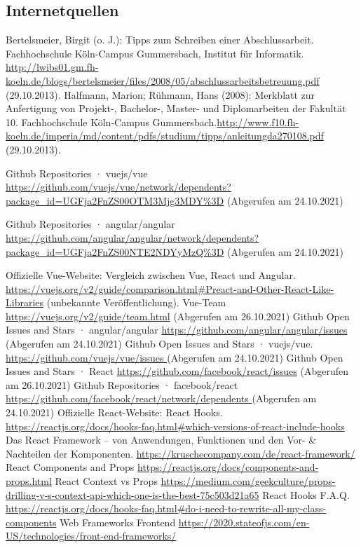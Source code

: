      \subsection{Internetquellen}
     \begin{thebibliography}{HR08} %
         Bertelsmeier, Birgit (o. J.): Tipps zum Schrei\-b\-en ei\-n\-er Ab\-sch\-luss\-ar\-beit. Fach\-hoch\-schu\-le Köln-Campus Gummersbach, Institut für Informatik. \url{http://lwibs01.gm.fh-koeln.de/blogs/bertelsmeier/files/2008/05/abschlussarbeitsbetreuung.pdf} (29.10.2013).
          Halfmann, Marion; Rühmann, Hans (2008): Merkblatt zur Anfertigung von Projekt-, Bachelor-, Master- und Diplomarbeiten der Fakultät 10. Fachhochschule Köln-Campus Gummersbach.\url{http://www.f10.fh-koeln.de/imperia/md/content/pdfs/studium/tipps/anleitungda270108.pdf} (29.10.2013).

          Github Repositories · vuejs/vue \url{ https://github.com/vuejs/vue/network/dependents?package_id=UGFja2FnZS00OTM3Mjg3MDY\%3D}
         (Abgerufen am 24.10.2021)

          Github Repositories · angular/angular \url{https://github.com/angular/angular/network/dependents?package_id=UGFja2FnZS00NTE2NDYyMzQ%3D}
         (Abgerufen am 24.10.2021)

          Offizielle Vue-Website: Vergleich zwischen Vue, React und Angular. \url{https://vuejs.org/v2/guide/comparison.html#Preact-and-Other-React-Like-Libraries} (unbekannte Veröffentlichung).
          Vue-Team \url{https://vuejs.org/v2/guide/team.html} (Abgerufen am 26.10.2021)
         Github Open Issues and Stars · angular/angular \url{ https://github.com/angular/angular/issues }  (Abgerufen am 24.10.2021)
          Github Open Issues and Stars · vuejs/vue. \url{ https://github.com/vuejs/vue/issues }  (Abgerufen am 24.10.2021)
          Github Open Issues and Stars · React \url{https://github.com/facebook/react/issues} (Abgerufen am 26.10.2021)
          Github Repositories · facebook/react \url{ https://github.com/facebook/react/network/dependents } (Abgerufen am 24.10.2021)
          Offizielle React-Website: React Hooks. \url{https://reactjs.org/docs/hooks-faq.html#which-versions-of-react-include-hooks}
          Das React Framework – von Anwendungen, Funktionen und den Vor- \& Nachteilen der Komponenten. \url{https://kruschecompany.com/de/react-framework/}
          React Components and Props \url{https://reactjs.org/docs/components-and-props.html}
          React Context vs Props \url{https://medium.com/geekculture/props-drilling-v-s-context-api-which-one-is-the-best-75c503d21a65}
          React Hooks F.A.Q. \url{https://reactjs.org/docs/hooks-faq.html#do-i-need-to-rewrite-all-my-class-components}
          Web Frameworks Frontend \url{https://2020.stateofjs.com/en-US/technologies/front-end-frameworks/}



\end{thebibliography}
